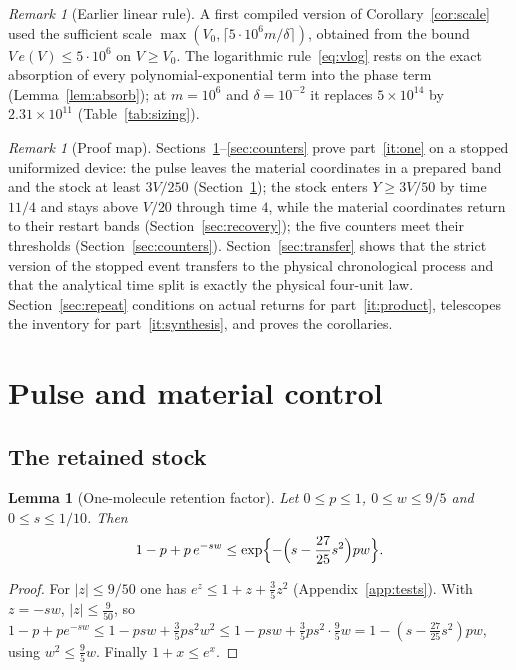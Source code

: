 \documentclass[11pt,a4paper]{article}
\theoremstyle{plain}
\newtheorem{lemma}[theorem]{Lemma}
\theoremstyle{definition}
\theoremstyle{remark}
\newtheorem{remark}[theorem]{Remark}
\begin{document}
\begin{remark}[Earlier linear rule]\label{rem:linear}
A first compiled version of Corollary~\ref{cor:scale} used the sufficient scale $\max(V_0,\lceil5\cdot10^6m/\delta\rceil)$, obtained from the bound $V\,e(V)\le5\cdot10^6$ on $V\ge V_0$. The logarithmic rule~\eqref{eq:vlog} rests on the exact absorption of every polynomial-exponential term into the phase term (Lemma~\ref{lem:absorb}); at $m=10^6$ and $\delta=10^{-2}$ it replaces $5\times10^{14}$ by $2.31\times10^{11}$ (Table~\ref{tab:sizing}).
\end{remark}

\begin{remark}[Proof map]
Sections~\ref{sec:pulse}--\ref{sec:counters} prove part~\ref{it:one} on a stopped uniformized device: the pulse leaves the material coordinates in a prepared band and the stock at least $3V/250$ (Section~\ref{sec:pulse}); the stock enters $Y\ge3V/50$ by time $11/4$ and stays above $V/20$ through time $4$, while the material coordinates return to their restart bands (Section~\ref{sec:recovery}); the five counters meet their thresholds (Section~\ref{sec:counters}). Section~\ref{sec:transfer} shows that the strict version of the stopped event transfers to the physical chronological process and that the analytical time split is exactly the physical four-unit law. Section~\ref{sec:repeat} conditions on actual returns for part~\ref{it:product}, telescopes the inventory for part~\ref{it:synthesis}, and proves the corollaries.
\end{remark}

\section{Pulse and material control}\label{sec:pulse}

\subsection{The retained stock}
\begin{lemma}[One-molecule retention factor]\label{lem:factor}
Let $0\le p\le1$, $0\le w\le9/5$ and $0\le s\le1/10$. Then
\[
1-p+p\,e^{-sw}\le\exp\Bigl\{-\Bigl(s-\frac{27}{25}s^2\Bigr)pw\Bigr\}.
\]
\end{lemma}
\begin{proof}
For $|z|\le9/50$ one has $e^{z}\le1+z+\tfrac35z^2$ (Appendix~\ref{app:tests}). With $z=-sw$, $|z|\le\tfrac9{50}$, so $1-p+pe^{-sw}\le1-psw+\tfrac35ps^2w^2\le1-psw+\tfrac35ps^2\cdot\tfrac95w=1-(s-\tfrac{27}{25}s^2)pw$, using $w^2\le\tfrac95w$. Finally $1+x\le e^x$.
\end{proof}
\end{document}
